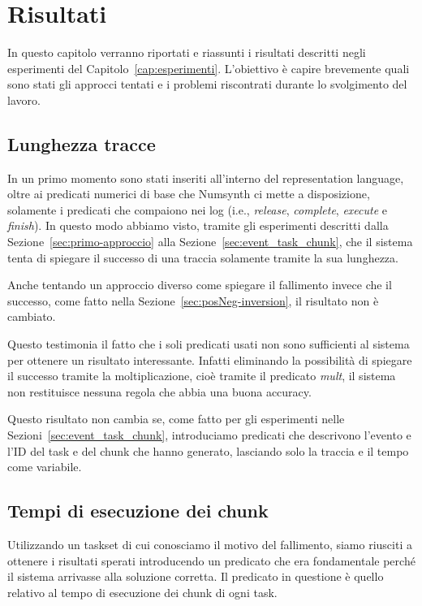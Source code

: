 \chapter{Risultati}
\label{cap:risultati}
In questo capitolo verranno riportati e riassunti i risultati descritti negli esperimenti del Capitolo~\ref{cap:esperimenti}. L'obiettivo è capire brevemente quali sono stati gli approcci tentati e i problemi riscontrati durante lo svolgimento del lavoro.

\section{Lunghezza tracce}
In un primo momento sono stati inseriti all'interno del representation language, oltre ai predicati numerici di base che Numsynth ci mette a disposizione, solamente i predicati che compaiono nei log (i.e., \textit{release}, \textit{complete}, \textit{execute} e \textit{finish}). In questo modo abbiamo visto, tramite gli esperimenti descritti dalla Sezione~\ref{sec:primo-approccio} alla Sezione~\ref{sec:event_task_chunk}, che il sistema tenta di spiegare il successo di una traccia solamente tramite la sua lunghezza.

Anche tentando un approccio diverso come spiegare il fallimento invece che il successo, come fatto nella Sezione~\ref{sec:posNeg-inversion}, il risultato non è cambiato.

Questo testimonia il fatto che i soli predicati usati non sono sufficienti al sistema per ottenere un risultato interessante. Infatti eliminando la possibilità di spiegare il successo tramite la moltiplicazione, cioè tramite il predicato \textit{mult}, il sistema non restituisce nessuna regola che abbia una buona accuracy.

Questo risultato non cambia se, come fatto per gli esperimenti nelle Sezioni~\ref{sec:event_task_chunk}, introduciamo predicati che descrivono l'evento e l'ID del task e del chunk che hanno generato, lasciando solo la traccia e il tempo come variabile.

\section{Tempi di esecuzione dei chunk}
Utilizzando un taskset di cui conosciamo il motivo del fallimento, siamo riusciti a ottenere i risultati sperati introducendo un predicato che era fondamentale perché il sistema arrivasse alla soluzione corretta. Il predicato in questione è quello relativo al tempo di esecuzione dei chunk di ogni task.

